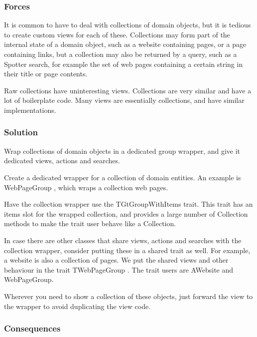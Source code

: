 \documentclass[sigconf]{acmart}
\begin{document}
\subsubsection*{Forces}

It is common to have to deal with collections of domain objects, but it is tedious to create custom views for each of these. Collections may form part of the internal state of a domain object, such as a website containing pages, or a page containing links, but a collection may also be returned by a query, such as a Spotter search, for example the set of web pages containing a certain string in their title or page contents.

Raw collections have uninteresting views. Collections are very similar and have a lot of boilerplate code. Many views are essentially collections, and have similar implementations.

\subsubsection*{Solution}

Wrap collections of domain objects in a dedicated group wrapper, and give it dedicated views, actions and searches.

Create a dedicated wrapper for a collection of domain entities. An example is WebPageGroup , which wraps a collection web pages.

Have the collection wrapper use the TGtGroupWithItems trait. This trait has an items slot for the wrapped collection, and provides a large number of Collection methods to make the trait user behave like a Collection.

In case there are other classes that share views, actions and searches with the collection wrapper, consider putting these in a shared trait as well. For example, a website is also a collection of pages. We put the shared views and other behaviour in the trait TWebPageGroup . The trait users are AWebsite and WebPageGroup.

Wherever you need to show a collection of these objects, just forward the view to the wrapper to avoid duplicating the view code. 


\subsubsection*{Consequences}



\end{document}
